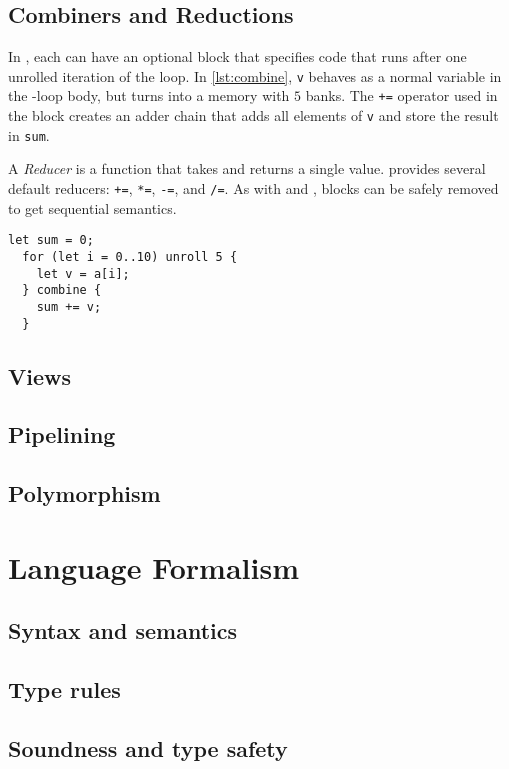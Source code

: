 \documentclass[acmsmall,review,anonymous]{acmart}\settopmatter{printfolios=true,printccs=false,printacmref=false}
\begin{document}
\subsection{Combiners and Reductions}
In \sys{}, each \sysfor{} can have an optional \syscombine{} block that specifies
code that runs after one unrolled iteration of the loop. In \cref{lst:combine},
\lstinline|v| behaves as a normal variable in the \sysfor{}-loop body, but
turns into a memory with $5$ banks. The \lstinline|+=| operator used in the
\syscombine{} block creates an adder chain that adds all elements of \lstinline|v|
and store the result in \lstinline|sum|.

A \textit{Reducer} is a function that takes  and returns a single
value. \sys{} provides several default reducers: \lstinline|+=|, \lstinline|*=|,
\lstinline|-=|, and \lstinline|/=|. As with \sysunroll{} and \sysbank{},
\syscombine{} blocks can be safely removed to get sequential semantics.

\begin{lstlisting}[caption={\sysfor{} loop with a \syscombine{} block}, label={lst:combine}, frame=single]
  let sum = 0;
  for (let i = 0..10) unroll 5 {
    let v = a[i];
  } combine {
    sum += v;
  }
\end{lstlisting}
\subsection{Views}
\subsection{Pipelining}
\subsection{Polymorphism}

\section{Language Formalism}
\subsection{Syntax and semantics}
\subsection{Type rules}
\subsection{Soundness and type safety}
\end{document}
